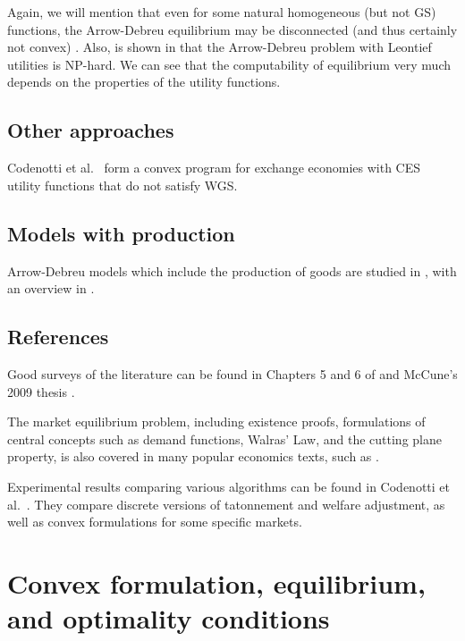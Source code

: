 \documentclass{article}
\begin{document}
Again, we will mention that even for some natural homogeneous (but not GS) functions, the Arrow-Debreu equilibrium may be disconnected (and thus certainly not convex) \cite{gjerstad1996multiple}.
Also, is shown in \cite{codenotti2006leontief} that the Arrow-Debreu problem with Leontief utilities is NP-hard.
We can see that the computability of equilibrium very much depends on the properties of the utility functions.


\subsection{Other approaches}
Codenotti et al.\ \cite{codenotti2005market,codenotti2005marketCES} form a convex program for exchange economies with CES utility functions that do not satisfy WGS.

\subsection{Models with production}
Arrow-Debreu models which include the production of goods are studied in \cite{garg2014computability,jain2005market,codenotti2005marketExcess}, with an overview in \cite[Chapters~5--6]{nisan2007algorithmic}. 

\subsection{References}
Good surveys of the literature can be found in Chapters 5 and 6 of \cite{nisan2007algorithmic} and McCune's 2009 thesis \cite{mccune2009algorithmic}.

The market equilibrium problem, including existence proofs, formulations of central concepts such as demand functions, Walras' Law, and the cutting plane property, is also covered in many popular economics texts, such as \cite{varian1992microeconomic, mas1995microeconomic, luenberger1995microeconomic, kreps1990course}.

Experimental results comparing various algorithms can be found in Codenotti et al.\ \cite{codenotti2008experimental}. They compare discrete versions of tatonnement and welfare adjustment, as well as convex formulations for some specific markets.


\section{Convex formulation, equilibrium, and optimality conditions}
\end{document}
